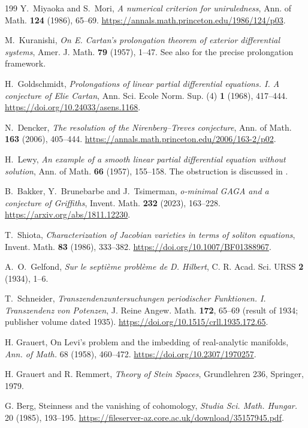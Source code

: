 \documentclass[11pt,reqno]{amsart}
\theoremstyle{definition}
\theoremstyle{remark}
\begin{document}
\begin{thebibliography}{199}
 Y.~Miyaoka and S.~Mori, \emph{A numerical criterion for uniruledness}, Ann. of Math. \textbf{124} (1986), 65--69. \url{https://annals.math.princeton.edu/1986/124/p03}.

 M.~Kuranishi, \emph{On E. Cartan's prolongation theorem of exterior differential systems}, Amer. J. Math. \textbf{79} (1957), 1--47. See also \cite{SIU-Gol68} for the precise prolongation framework.

 H.~Goldschmidt, \emph{Prolongations of linear partial differential equations. I. A conjecture of Elie Cartan}, Ann. Sci. Ecole Norm. Sup. (4) \textbf{1} (1968), 417--444. \url{https://doi.org/10.24033/asens.1168}.

 N.~Dencker, \emph{The resolution of the Nirenberg--Treves conjecture}, Ann. of Math. \textbf{163} (2006), 405--444. \url{https://annals.math.princeton.edu/2006/163-2/p02}.

 H.~Lewy, \emph{An example of a smooth linear partial differential equation without solution}, Ann. of Math. \textbf{66} (1957), 155--158. The obstruction is discussed in \cite{SIU-Den06}.

 B.~Bakker, Y.~Brunebarbe and J.~Tsimerman, \emph{o-minimal GAGA and a conjecture of Griffiths}, Invent. Math. \textbf{232} (2023), 163--228. \url{https://arxiv.org/abs/1811.12230}.

 T.~Shiota, \emph{Characterization of Jacobian varieties in terms of soliton equations}, Invent. Math. \textbf{83} (1986), 333--382. \url{https://doi.org/10.1007/BF01388967}.

 A.~O.~Gelfond, \emph{Sur le septi\`eme probl\`eme de D. Hilbert}, C. R. Acad. Sci. URSS \textbf{2} (1934), 1--6.

 T.~Schneider, \emph{Transzendenzuntersuchungen periodischer Funktionen. I. Transzendenz von Potenzen}, J. Reine Angew. Math. \textbf{172}, 65--69 (result of 1934; publisher volume dated 1935). \url{https://doi.org/10.1515/crll.1935.172.65}.

 H. Grauert, On Levi's problem and the imbedding of real-analytic manifolds, \emph{Ann. of Math.} 68 (1958), 460--472. \url{https://doi.org/10.2307/1970257}.

 H. Grauert and R. Remmert, \emph{Theory of Stein Spaces}, Grundlehren 236, Springer, 1979.

 G. Berg, Steinness and the vanishing of cohomology, \emph{Studia Sci. Math. Hungar.} 20 (1985), 193--195. \url{https://fileserver-az.core.ac.uk/download/35157945.pdf}.


\end{thebibliography}
\end{document}
